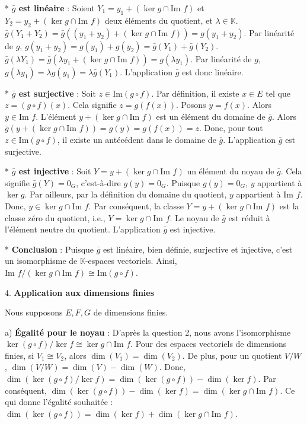 \documentclass{report}
\begin{document}
    *   \textbf{$\bar{g}$ est linéaire} :
        Soient $Y_1 = y_1 + (\ker g \cap \text{Im } f)$ et $Y_2 = y_2 + (\ker g \cap \text{Im } f)$ deux éléments du quotient, et $\lambda \in \mathbb{K}$.
        $\bar{g}(Y_1 + Y_2) = \bar{g}((y_1+y_2) + (\ker g \cap \text{Im } f)) = g(y_1+y_2)$.
        Par linéarité de $g$, $g(y_1+y_2) = g(y_1) + g(y_2) = \bar{g}(Y_1) + \bar{g}(Y_2)$.
        $\bar{g}(\lambda Y_1) = \bar{g}(\lambda y_1 + (\ker g \cap \text{Im } f)) = g(\lambda y_1)$.
        Par linéarité de $g$, $g(\lambda y_1) = \lambda g(y_1) = \lambda \bar{g}(Y_1)$.
        L'application $\bar{g}$ est donc linéaire.

    *   \textbf{$\bar{g}$ est surjective} :
        Soit $z \in \text{Im}(g \circ f)$. Par définition, il existe $x \in E$ tel que $z = (g \circ f)(x)$.
        Cela signifie $z = g(f(x))$.
        Posons $y = f(x)$. Alors $y \in \text{Im } f$.
        L'élément $y + (\ker g \cap \text{Im } f)$ est un élément du domaine de $\bar{g}$.
        Alors $\bar{g}(y + (\ker g \cap \text{Im } f)) = g(y) = g(f(x)) = z$.
        Donc, pour tout $z \in \text{Im}(g \circ f)$, il existe un antécédent dans le domaine de $\bar{g}$.
        L'application $\bar{g}$ est surjective.

    *   \textbf{$\bar{g}$ est injective} :
        Soit $Y = y + (\ker g \cap \text{Im } f)$ un élément du noyau de $\bar{g}$.
        Cela signifie $\bar{g}(Y) = 0_G$, c'est-à-dire $g(y) = 0_G$.
        Puisque $g(y) = 0_G$, $y$ appartient à $\ker g$.
        Par ailleurs, par la définition du domaine du quotient, $y$ appartient à $\text{Im } f$.
        Donc, $y \in \ker g \cap \text{Im } f$.
        Par conséquent, la classe $Y = y + (\ker g \cap \text{Im } f)$ est la classe zéro du quotient, i.e., $Y = \ker g \cap \text{Im } f$.
        Le noyau de $\bar{g}$ est réduit à l'élément neutre du quotient.
        L'application $\bar{g}$ est injective.

    *   \textbf{Conclusion} :
        Puisque $\bar{g}$ est linéaire, bien définie, surjective et injective, c'est un isomorphisme de $\mathbb{K}$-espaces vectoriels.
        Ainsi, $\text{Im } f / (\ker g \cap \text{Im } f) \cong \text{Im}(g \circ f)$.

4.  \textbf{Application aux dimensions finies}

    Nous supposons $E, F, G$ de dimensions finies.

    a) \textbf{Égalité pour le noyau} :
        D'après la question 2, nous avons l'isomorphisme $\ker(g \circ f) / \ker f \cong \ker g \cap \text{Im } f$.
        Pour des espaces vectoriels de dimensions finies, si $V_1 \cong V_2$, alors $\dim(V_1) = \dim(V_2)$.
        De plus, pour un quotient $V/W$, $\dim(V/W) = \dim(V) - \dim(W)$.
        Donc, $\dim(\ker(g \circ f) / \ker f) = \dim(\ker(g \circ f)) - \dim(\ker f)$.
        Par conséquent, $\dim(\ker(g \circ f)) - \dim(\ker f) = \dim(\ker g \cap \text{Im } f)$.
        Ce qui donne l'égalité souhaitée :
        $\dim(\ker(g \circ f)) = \dim(\ker f) + \dim(\ker g \cap \text{Im } f)$.
\end{document}
